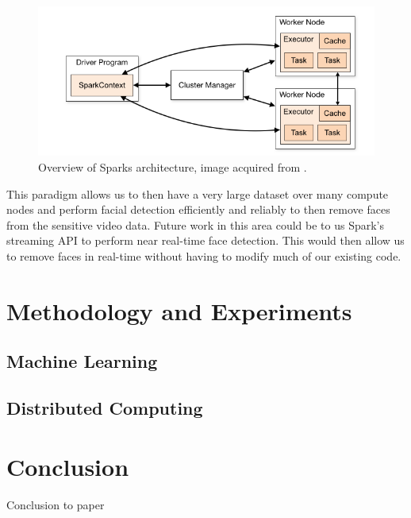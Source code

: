 \documentclass[
	submission,
	final,
	notitlepage,
	narroweqnarray,
	inline,
	twoside,
	]{ieee}
\begin{document}
\begin{figure}[h]
\centering
\includegraphics[width=\linewidth]{figures/spark_model}
\caption{Overview of Sparks architecture, image acquired from \cite{spark}.}
\label{fig:spark_model}
\end{figure}
\FloatBarrier

This paradigm allows us to then have a very large dataset over many compute
nodes and perform facial detection efficiently and reliably to then
remove faces from the sensitive video data. Future work in this area
could be to us Spark's streaming API to perform near real-time face detection.
This would then allow us to remove faces in real-time without having to
modify much of our existing code.

\section{Methodology and Experiments}
\subsection{Machine Learning}
\subsection{Distributed Computing}

\section{Conclusion}
\PARstart Conclusion to paper



\end{document}
